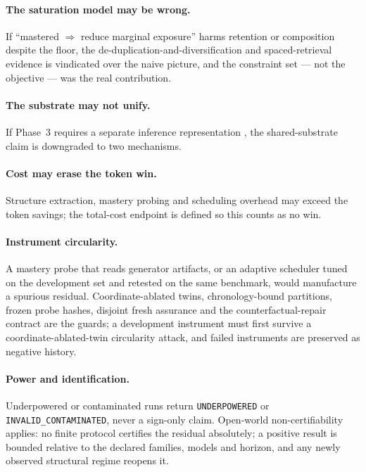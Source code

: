 \documentclass[11pt]{article}
\newcommand{\code}[1]{\texttt{#1}}
\begin{document}
\paragraph{The saturation model may be wrong.} If ``mastered $\Rightarrow$ reduce marginal exposure'' harms retention or composition despite the floor, the de-duplication-and-diversification and spaced-retrieval evidence \cite{tirumala2023d4,abbas2023semdedup,butler2010} is vindicated over the naive picture, and the constraint set --- not the objective --- was the real contribution.

\paragraph{The substrate may not unify.} If Phase~3 requires a separate inference representation \cite{ling2026rex,chen2026structural}, the shared-substrate claim is downgraded to two mechanisms.

\paragraph{Cost may erase the token win.} Structure extraction, mastery probing and scheduling overhead may exceed the token savings; the total-cost endpoint is defined so this counts as no win.

\paragraph{Instrument circularity.} A mastery probe that reads generator artifacts, or an adaptive scheduler tuned on the development set and retested on the same benchmark, would manufacture a spurious residual. Coordinate-ablated twins, chronology-bound partitions, frozen probe hashes, disjoint fresh assurance and the counterfactual-repair contract are the guards; a development instrument must first survive a coordinate-ablated-twin circularity attack, and failed instruments are preserved as negative history.

\paragraph{Power and identification.} Underpowered or contaminated runs return \code{UNDERPOWERED} or \code{INVALID\_CONTAMINATED}, never a sign-only claim. Open-world non-certifiability applies: no finite protocol certifies the residual absolutely; a positive result is bounded relative to the declared families, models and horizon, and any newly observed structural regime reopens it.
\end{document}
